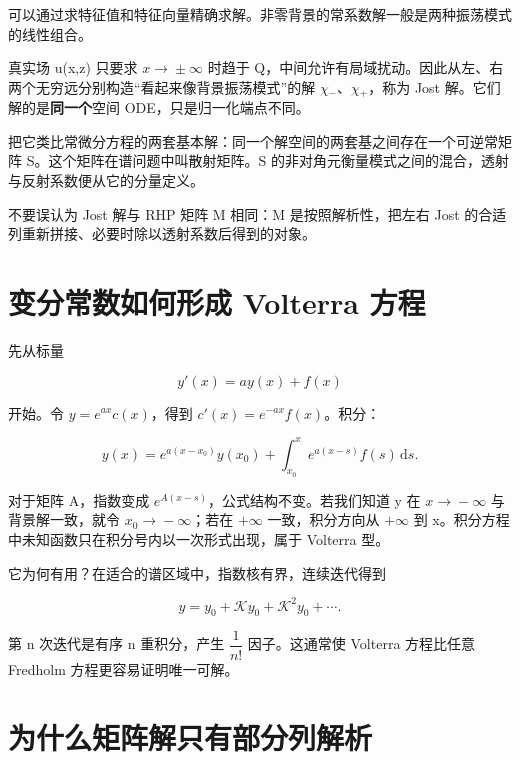 可以通过求特征值和特征向量精确求解。非零背景的常系数解一般是两种振荡模式的线性组合。\par

真实场 u(x,z) 只要求 $x\to{}\pm{}\infty{}$ 时趋于 Q，中间允许有局域扰动。因此从左、右两个无穷远分别构造“看起来像背景振荡模式”的解 $\chi{}_{-}$、$\chi{}_{+}$，称为 Jost 解。它们解的是\textbf{同一个}空间 ODE，只是归一化端点不同。\par

把它类比常微分方程的两套基本解：同一个解空间的两套基之间存在一个可逆常矩阵 S。这个矩阵在谱问题中叫散射矩阵。S 的非对角元衡量模式之间的混合，透射与反射系数便从它的分量定义。\par

不要误认为 Jost 解与 RHP 矩阵 M 相同：M 是按照解析性，把左右 Jost 的合适列重新拼接、必要时除以透射系数后得到的对象。\par

\section{变分常数如何形成 Volterra 方程}

先从标量\par

\[
y'(x)=ay(x)+f(x)
\]

开始。令 $y=e^{ax}c(x)$，得到 $c'(x)=e^{-ax}f(x)$。积分：\par

\[
y(x)=e^{a(x-x_0)}y(x_0)+
\int_{x_0}^{x}e^{a(x-s)}f(s)\,\mathrm{d}s.
\]

对于矩阵 A，指数变成 $e^{A(x-s)}$，公式结构不变。若我们知道 y 在 $x\to{}-\infty{}$ 与背景解一致，就令 $x_{0}\to{}-\infty{}$；若在 $+\infty{}$ 一致，积分方向从 $+\infty{}$ 到 x。积分方程中未知函数只在积分号内以一次形式出现，属于 Volterra 型。\par

它为何有用？在适合的谱区域中，指数核有界，连续迭代得到\par

\[
y=y_0+\mathcal K y_0+\mathcal K^2 y_0+\cdots.
\]

第 n 次迭代是有序 n 重积分，产生 $\dfrac{1}{n!}$ 因子。这通常使 Volterra 方程比任意 Fredholm 方程更容易证明唯一可解。\par

\section{为什么矩阵解只有部分列解析}

